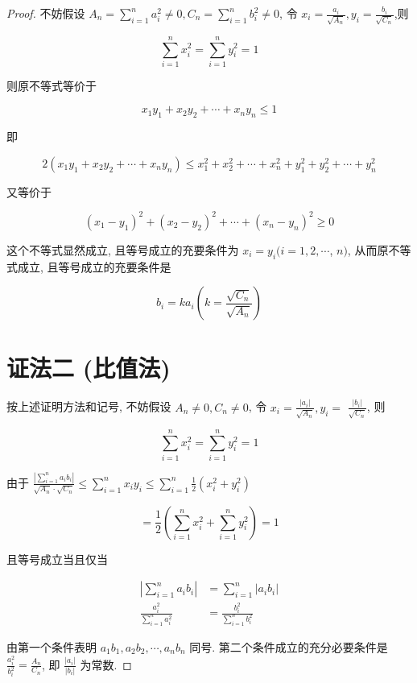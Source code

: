 \begin{proof}
	不妨假设 $A_{n}=\sum_{i=1}^{n} a_{i}^{2} \neq 0, C_{n}=\sum_{i=1}^{n} b_{i}^{2} \neq 0$, 令 $x_{i}=\frac{a_{i}}{\sqrt{A_{n}}}, y_{i}=\frac{b_{i}}{\sqrt{C_{n}}}$,则
	
	$$
	\sum_{i=1}^{n} x_{i}^{2}=\sum_{i=1}^{n} y_{i}^{2}=1
	$$
	
	则原不等式等价于
	
	$$
	x_{1} y_{1}+x_{2} y_{2}+\cdots+x_{n} y_{n} \leqslant 1
	$$
	
	即
	
	$$
	2\left(x_{1} y_{1}+x_{2} y_{2}+\cdots+x_{n} y_{n}\right) \leqslant x_{1}^{2}+x_{2}^{2}+\cdots+x_{n}^{2}+y_{1}^{2}+y_{2}^{2}+\cdots+y_{n}^{2}
	$$
	
	又等价于
	
	$$
	\left(x_{1}-y_{1}\right)^{2}+\left(x_{2}-y_{2}\right)^{2}+\cdots+\left(x_{n}-y_{n}\right)^{2} \geqslant 0
	$$
	
	这个不等式显然成立, 且等号成立的充要条件为 $x_{i}=y_{i}(i=1,2, \cdots$, $n)$, 从而原不等式成立, 且等号成立的充要条件是
	
	$$
	b_{i}=k a_{i}\left(k=\frac{\sqrt{C_{n}}}{\sqrt{A_{n}}}\right)
	$$
	
	\section*{证法二 (比值法)}
	按上述证明方法和记号, 不妨假设 $A_{n} \neq 0, C_{n} \neq 0$, 令 $x_{i}=\frac{\left|a_{i}\right|}{\sqrt{A_{n}}}, y_{i}=$ $\frac{\left|b_{i}\right|}{\sqrt{C_{n}}}$, 则
	
	$$
	\sum_{i=1}^{n} x_{i}^{2}=\sum_{i=1}^{n} y_{i}^{2}=1
	$$
	
	由于 $\frac{\left|\sum_{i=1}^{n} a_{i} b_{i}\right|}{\sqrt{A_{n}} \cdot \sqrt{C_{n}}} \leqslant \sum_{i=1}^{n} x_{i} y_{i} \leqslant \sum_{i=1}^{n} \frac{1}{2}\left(x_{i}^{2}+y_{i}^{2}\right)$
	
	$$
	=\frac{1}{2}\left(\sum_{i=1}^{n} x_{i}^{2}+\sum_{i=1}^{n} y_{i}^{2}\right)=1
	$$
	
	且等号成立当且仅当
	
	$$
	\begin{aligned}
	\left|\sum_{i=1}^{n} a_{i} b_{i}\right| & =\sum_{i=1}^{n}\left|a_{i} b_{i}\right| \\
	\frac{a_{i}^{2}}{\sum_{i=1}^{n} a_{i}^{2}} & =\frac{b_{i}^{2}}{\sum_{i=1}^{n} b_{i}^{2}}
	\end{aligned}
	$$
	
	由第一个条件表明 $a_{1} b_{1}, a_{2} b_{2}, \cdots, a_{n} b_{n}$ 同号. 第二个条件成立的充分必要条件是 $\frac{a_{i}^{2}}{b_{i}^{2}}=\frac{A_{n}}{C_{n}}$, 即 $\frac{\left|a_{i}\right|}{\left|b_{i}\right|}$ 为常数.
	

\end{proof}
